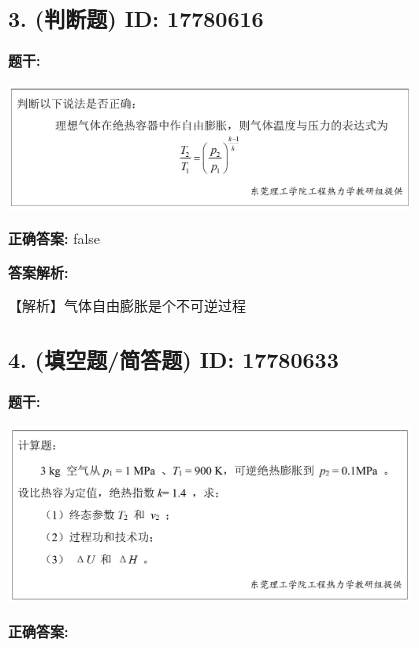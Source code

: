 \documentclass[12pt]{article}
\begin{document}
\subsection*{3. (判断题) \small ID: 17780616}

\textbf{题干:}


\begin{center}\includegraphics[width=0.8\textwidth, height=0.25\textheight, keepaspectratio]{question_3_17780616/title_img_1.png}\end{center}

\textbf{正确答案:}
false

\textbf{答案解析:}

【解析】气体自由膨胀是个不可逆过程

\vspace{0.5em}\hrulefill\vspace{1em}

\subsection*{4. (填空题/简答题) \small ID: 17780633}

\textbf{题干:}


\begin{center}\includegraphics[width=0.8\textwidth, height=0.25\textheight, keepaspectratio]{question_4_17780633/title_img_1.png}\end{center}

\textbf{正确答案:}
\end{document}
